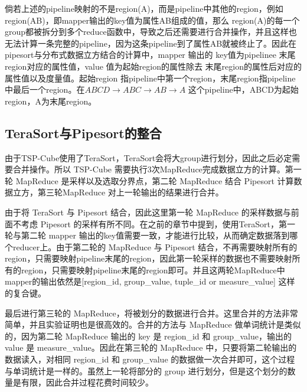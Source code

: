 倘若上述的pipeline映射的不是region(A)，而是pipeline中其他的region，例如region(AB)，即mapper输出的key值为属性AB组成的值，那么 region(A)的每一个group都被拆分到多个reduce函数中，导致之后还需要进行合并操作，并且这样也无法计算一条完整的pipeline，因为这条pipeline到了属性AB就被终止了。因此在pipesort与分布式数据立方结合的计算中，mapper 输出的 key值为pipelinee 末尾region对应的属性值，value 值为起始region的属性除去 末尾region的属性后对应的属性值以及度量值。起始region 指pipeline中第一个region，末尾region指pipeline中最后一个region。在$ABCD\rightarrow ABC\rightarrow AB\rightarrow A$ 这个pipeline中，ABCD为起始region，A为末尾region。



\subsection{TeraSort与Pipesort的整合}

由于TSP-Cube使用了TeraSort，TeraSort会将大group进行划分，因此之后必定需要合并操作。所以 TSP-Cube 需要执行3次MapReduce完成数据立方的计算。第一轮 MapReduce 是采样以及选取分界点，第二轮 MapReduce 结合 Pipesort 计算数据立方，第三轮MapReduce 对上一轮输出的结果进行合并。

由于将 TeraSort 与 Pipesort 结合，因此这里第一轮 MapReduce 的采样数据与前面不考虑 Pipesort 的采样有所不同。在之前的章节中提到，使用TeraSort，第一轮与第二轮 mapper 输出的key值需要一致，才能进行比较，从而确定数据落到哪个reducer上。由于第二轮的 MapReduce 与 Pipesort 结合，不再需要映射所有的region，只需要映射pipeline末尾的region，因此第一轮采样的数据也不需要映射所有的region，只需要映射pipeline末尾的region即可。并且这两轮MapReduce中 mapper的输出依然是[region\_id, group\_value, tuple\_id or measure\_value] 这样的复合键。



最后进行第三轮的 MapReduce，将被划分的数据进行合并。这里合并的方法非常简单，并且实验证明也是很高效的。合并的方法与 MapReduce 做单词统计是类似的，因为第二轮 MapReduce 输出的 key 是 region\_id 和 group\_value，输出的 value 是 measure\_value。因此在第三轮的 MapReduce 中，只要将第二轮输出的数据读入，对相同 region\_id 和 group\_value 的数据做一次合并即可，这个过程与单词统计是一样的。虽然上一轮将部分的 group 进行划分，但是这个划分的数量是有限，因此合并过程花费时间较少。


